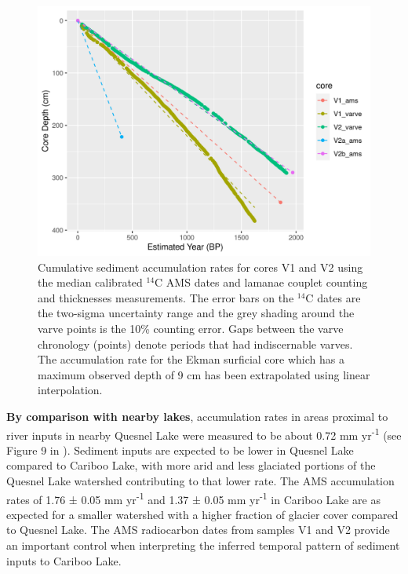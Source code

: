 \documentclass[Royal,times,doublespace,sageh]{sagej}
\begin{document}
\begin{figure}

{\centering \includegraphics[width=1\linewidth]{figs/longcore_cumulative_depth_vs_estimated_year_w_ams_and_varve} 

}

\caption{Cumulative sediment accumulation rates for cores V1 and V2 using the median calibrated $^{14}$C AMS dates and lamanae couplet counting and thicknesses measurements. The error bars on the $^{14}$C dates are the two-sigma uncertainty range and the grey shading around the varve points is the 10\% counting error. Gaps between the varve chronology (points) denote periods that had indiscernable varves. The accumulation rate for the Ekman surficial core which has a maximum observed depth of 9 cm has been extrapolated using linear interpolation.}\label{fig:amsRates}
\end{figure}

\textbf{By comparison with nearby lakes}, accumulation rates in areas
proximal to river inputs in nearby Quesnel Lake were measured to be
about 0.72 mm yr\textsuperscript{-1} (see Figure 9 in
\citet{Gilbert2012}). Sediment inputs are expected to be lower in
Quesnel Lake compared to Cariboo Lake, with more arid and less glaciated
portions of the Quesnel Lake watershed contributing to that lower rate.
The AMS accumulation rates of 1.76 ± 0.05 mm yr\textsuperscript{-1} and
1.37 ± 0.05 mm yr\textsuperscript{-1} in Cariboo Lake are as expected
for a smaller watershed with a higher fraction of glacier cover compared
to Quesnel Lake. The AMS radiocarbon dates from samples V1 and V2
provide an important control when interpreting the inferred temporal
pattern of sediment inputs to Cariboo Lake.
\end{document}
